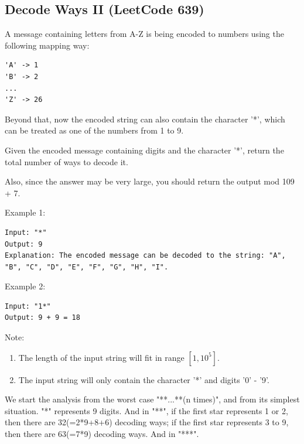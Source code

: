 \documentclass[11pt]{article}
\begin{document}
\inputminted[breaklines=true,frame=leftline, linenos=true]{python}{src/numDecodings_dp.py}

\subsection{Decode Ways II (LeetCode 639)}
A message containing letters from A-Z is being encoded to numbers using the following mapping way:
\begin{verbatim}
'A' -> 1
'B' -> 2
...
'Z' -> 26	
\end{verbatim}

Beyond that, now the encoded string can also contain the character '*', which can be treated as one of the numbers from 1 to 9.

Given the encoded message containing digits and the character '*', return the total number of ways to decode it.

Also, since the answer may be very large, you should return the output mod 109 + 7.

Example 1:
\begin{verbatim}
Input: "*"
Output: 9
Explanation: The encoded message can be decoded to the string: "A", "B", "C", "D", "E", "F", "G", "H", "I".	
\end{verbatim}

Example 2:
\begin{verbatim}
Input: "1*"
Output: 9 + 9 = 18	
\end{verbatim}

Note:
\begin{enumerate}
	\item The length of the input string will fit in range $[1, 10^5]$.
	\item The input string will only contain the character '*' and digits '0' - '9'.
\end{enumerate}

We start the analysis from the worst case "**...**(n times)", and from its simplest situation.
"*" represents 9 digits. 
And in "**", if the first star represents 1 or 2, then there are 32(=2*9+8+6) decoding ways; if the first star represents 3 to 9, then there are 63(=7*9) decoding ways. 
And in "***". 
\end{document}

